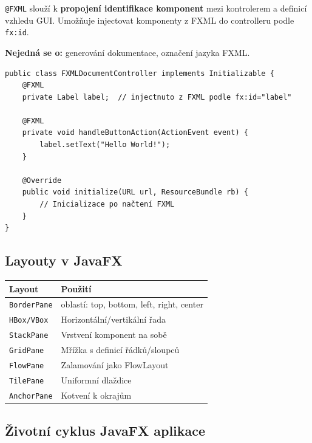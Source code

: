 \documentclass[11pt,a4paper]{article}
\begin{document}
\begin{tcolorbox}[warnbox,title=Účel anotace @FXML]
\texttt{@FXML} slouží k \textbf{propojení identifikace komponent} mezi kontrolerem a definicí vzhledu GUI. Umožňuje injectovat komponenty z FXML do controlleru podle \texttt{fx:id}.

\textbf{Nejedná se o:} generování dokumentace, označení jazyka FXML.
\end{tcolorbox}

\begin{verbatim}
public class FXMLDocumentController implements Initializable {
    @FXML
    private Label label;  // injectnuto z FXML podle fx:id="label"
    
    @FXML
    private void handleButtonAction(ActionEvent event) {
        label.setText("Hello World!");
    }
    
    @Override
    public void initialize(URL url, ResourceBundle rb) {
        // Inicializace po načtení FXML
    }
}
\end{verbatim}

\subsection{Layouty v JavaFX}

\begin{center}
\begin{tabular}{>{\raggedright}p{3cm} >{\raggedright\arraybackslash}p{9cm}}
\toprule
\textbf{Layout} & \textbf{Použití} \\
\midrule
\texttt{BorderPane} & 5 oblastí: top, bottom, left, right, center \\
\texttt{HBox/VBox} & Horizontální/vertikální řada \\
\texttt{StackPane} & Vrstvení komponent na sobě \\
\texttt{GridPane} & Mřížka s definicí řádků/sloupců \\
\texttt{FlowPane} & Zalamování jako FlowLayout \\
\texttt{TilePane} & Uniformní dlaždice \\
\texttt{AnchorPane} & Kotvení k okrajům \\
\bottomrule
\end{tabular}
\end{center}

\subsection{Životní cyklus JavaFX aplikace}
\end{document}
